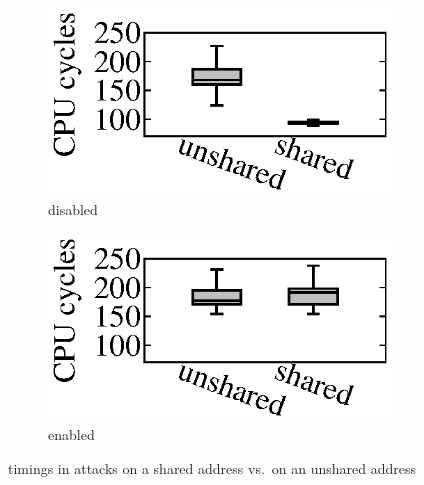 \begin{figure}[t]
\centering
\begin{subfigure}[b]{0.49\textwidth}
\includegraphics[width=0.95\linewidth]{fig/cachebar/eval/flushreload.eps}
\caption{\cachebar disabled}
\label{fig:flushreload_covert:linux}
\end{subfigure}
\begin{subfigure}[b]{0.49\textwidth}
\includegraphics[width=0.95\linewidth]{fig/cachebar/eval/flushreload-w.eps}
\caption{\cachebar enabled}
\label{fig:flushreload_covert:cachebar}
\end{subfigure}
\vspace{-0.1in}\caption{\Reload timings in \flushreload attacks on a
  shared address vs.\ on an unshared address}
\label{fig:flushreload_covert}
\end{figure}

